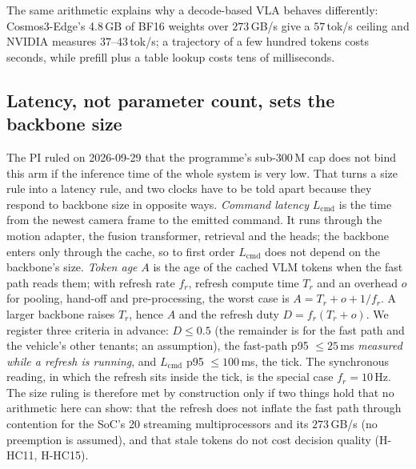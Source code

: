 The same arithmetic explains why a decode-based VLA behaves differently: Cosmos3-Edge's 4.8\,GB of BF16 weights over $273$\,GB/s give a $57$\,tok/s ceiling and NVIDIA measures $37$--$43$\,tok/s\evP; a trajectory of a few hundred tokens costs seconds, while prefill plus a table lookup costs tens of milliseconds.

\subsection{Latency, not parameter count, sets the backbone size}\label{sec:latency}
The PI ruled on 2026-09-29 that the programme's sub-300\,M cap does not bind this arm if the inference time of the whole system is very low. That turns a size rule into a latency rule, and two clocks have to be told apart because they respond to backbone size in opposite ways.
\emph{Command latency} $L_{\text{cmd}}$ is the time from the newest camera frame to the emitted command. It runs through the motion adapter, the fusion transformer, retrieval and the heads; the backbone enters only through the cache, so to first order $L_{\text{cmd}}$ does not depend on the backbone's size. \emph{Token age} $A$ is the age of the cached VLM tokens when the fast path reads them; with refresh rate $f_r$, refresh compute time $T_r$ and an overhead $o$ for pooling, hand-off and pre-processing, the worst case is $A=T_r+o+1/f_r$. A larger backbone raises $T_r$, hence $A$ and the refresh duty $D=f_r(T_r+o)$. We register three criteria in advance: $D\le0.5$ (the remainder is for the fast path and the vehicle's other tenants; an assumption), the fast-path p95 $\le25$\,ms \emph{measured while a refresh is running}, and $L_{\text{cmd}}$ p95 $\le100$\,ms, the tick. The synchronous reading, in which the refresh sits inside the tick, is the special case $f_r=10$\,Hz. The size ruling is therefore met by construction only if two things hold that no arithmetic here can show: that the refresh does not inflate the fast path through contention for the SoC's 20 streaming multiprocessors\evI{} and its $273$\,GB/s\evP{} (no preemption is assumed), and that stale tokens do not cost decision quality (H-HC11, H-HC15).

